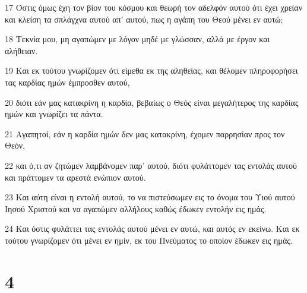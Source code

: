 \par 17 Όστις όμως έχη τον βίον του κόσμου και θεωρή τον αδελφόν αυτού ότι έχει χρείαν και κλείση τα σπλάγχνα αυτού απ' αυτού, πως η αγάπη του Θεού μένει εν αυτώ;
\par 18 Τεκνία μου, μη αγαπώμεν με λόγον μηδέ με γλώσσαν, αλλά με έργον και αλήθειαν.
\par 19 Και εκ τούτου γνωρίζομεν ότι είμεθα εκ της αληθείας, και θέλομεν πληροφορήσει τας καρδίας ημών έμπροσθεν αυτού,
\par 20 διότι εάν μας κατακρίνη η καρδία, βεβαίως ο Θεός είναι μεγαλήτερος της καρδίας ημών και γνωρίζει τα πάντα.
\par 21 Αγαπητοί, εάν η καρδία ημών δεν μας κατακρίνη, έχομεν παρρησίαν προς τον Θεόν,
\par 22 και ό,τι αν ζητώμεν λαμβάνομεν παρ' αυτού, διότι φυλάττομεν τας εντολάς αυτού και πράττομεν τα αρεστά ενώπιον αυτού.
\par 23 Και αύτη είναι η εντολή αυτού, το να πιστεύσωμεν εις το όνομα του Υιού αυτού Ιησού Χριστού και να αγαπώμεν αλλήλους καθώς έδωκεν εντολήν εις ημάς.
\par 24 Και όστις φυλάττει τας εντολάς αυτού μένει εν αυτώ, και αυτός εν εκείνω. Και εκ τούτου γνωρίζομεν ότι μένει εν ημίν, εκ του Πνεύματος το οποίον έδωκεν εις ημάς.

\chapter{4}

